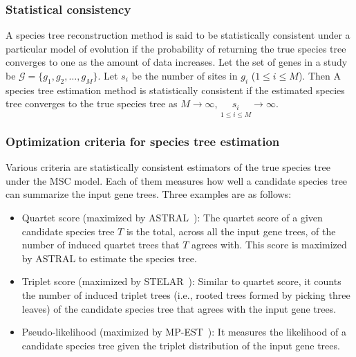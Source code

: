 \subsubsection{Statistical consistency}

A species tree reconstruction method is said to be statistically consistent under a particular model of evolution if the probability of returning the true species tree converges to one as the amount of data increases. Let the set of genes in a study be $\mathcal{G} = \{g_1, g_2, \dots, g_M\}$. Let $s_i$ be the number of sites in $g_i$ ($1 \leq i \leq M$). Then A species tree estimation method is statistically consistent if the estimated species tree converges to the true species tree as $M \rightarrow \infty$, $\underset{1 \leq i \leq M}{s_i} \rightarrow \infty$.


\subsubsection{Optimization criteria for species tree estimation}
Various criteria are statistically consistent estimators of the true species tree under the MSC model. Each of them measures how well a candidate species tree can summarize the input gene trees. Three examples are as follows:
\begin{itemize}
	\item Quartet score (maximized by ASTRAL~\cite{mirarab2014astral}): The quartet score of a given candidate species tree $T$ is the total, across all the input gene trees, of the number of induced quartet trees that $T$ agrees with. This score is maximized by ASTRAL to estimate the species tree.
	\item Triplet score (maximized by STELAR~\cite{islam2019stelar}): Similar to quartet score, it counts the number of induced triplet trees (i.e., rooted trees formed by picking three leaves) of the candidate species tree that agrees with the input gene trees.
	\item Pseudo-likelihood (maximized by MP-EST~\cite{mpest}): It measures the likelihood of a candidate species tree given the triplet distribution of the input gene trees.
\end{itemize}


